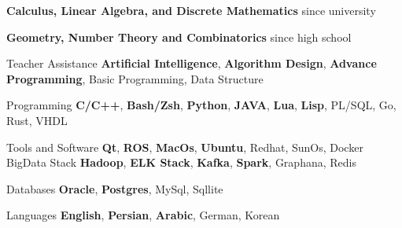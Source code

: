 




\begin{cvskills}

{
\begin{cvitems} %
      \item {\textbf{Calculus, Linear Algebra, and Discrete Mathematics} since university}
      \item {\textbf{Geometry, Number Theory and Combinatorics} since high school}
\end{cvitems}
}


  \cvskill
    {Teacher Assistance} %
    {\textbf{Artificial Intelligence}, \textbf{Algorithm Design}, \textbf{Advance Programming}, Basic Programming, Data Structure} %



  \cvskill
    {Programming} %
    {\textbf{C/C++}, \textbf{Bash/Zsh}, \textbf{Python}, \textbf{JAVA}, \textbf{Lua}, \textbf{Lisp}, PL/SQL, Go, Rust, VHDL} %

  \cvskill
    {Tools and Software} %
    {\textbf{Qt}, \textbf{ROS}, \textbf{MacOs}, \textbf{Ubuntu}, Redhat, SunOs, Docker} %
  \cvskill
    {BigData Stack} %
    {\textbf{Hadoop}, \textbf{ELK Stack}, \textbf{Kafka}, \textbf{Spark}, Graphana, Redis} %


  \cvskill
    {Databases} %
    {\textbf{Oracle}, \textbf{Postgres}, MySql, Sqllite} %

  \cvskill
    {Languages} %
    {\textbf{English}, \textbf{Persian}, \textbf{Arabic}, German, Korean} %
\end{cvskills}
